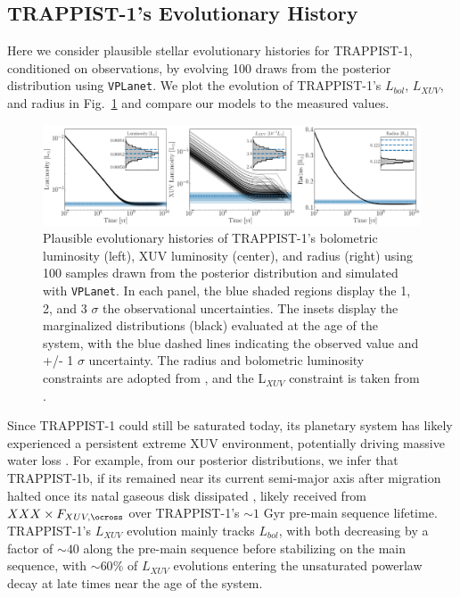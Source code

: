 \documentclass[twocolumn]{aastex62}
\newcommand{\vplanet}[0]{\texttt{VPLanet}\xspace}
\begin{document}
\subsection{TRAPPIST-1's Evolutionary History}

Here we consider plausible stellar evolutionary histories for TRAPPIST-1, conditioned on observations, by evolving 100 draws from the posterior distribution using \vplanet. We plot the evolution of TRAPPIST-1's $L_{bol}$, $L_{XUV}$, and radius in Fig.~\ref{fig:evol} and compare our models to the measured values. 

\begin{figure}[t]
	\includegraphics[width=\textwidth]{../Analysis/Evol/trappist1Evol.pdf}
   \caption{Plausible evolutionary histories of TRAPPIST-1's bolometric luminosity (left), XUV luminosity (center), and radius (right) using 100 samples drawn from the posterior distribution and simulated with \vplanet. In each panel, the blue shaded regions display the 1, 2, and 3 $\sigma$ the observational uncertainties. The insets display the marginalized distributions (black) evaluated at the age of the system, with the blue dashed lines indicating the observed value and +/- 1 $\sigma$ uncertainty. The radius and bolometric luminosity constraints are adopted from \citet{vanGrootel2018}, and the L$_{XUV}$ constraint is taken from \citet{Wheatley2017}.}%
    \label{fig:evol}%
\end{figure}

Since TRAPPIST-1 could still be saturated today, its planetary system has likely experienced a persistent extreme XUV environment, potentially driving massive water loss \citep[][;Fleming et al., in prep]{Luger2015,Bolmont2017,Bourrier2017}. For example, from our posterior distributions, we infer that TRAPPIST-1b, if its remained near its current semi-major axis after migration halted once its natal gaseous disk dissipated \citep{Luger2017}, likely received from $XXX \times F_{XUV,\ocross}$ over TRAPPIST-1's ${\sim}1$ Gyr pre-main sequence lifetime. TRAPPIST-1's $L_{XUV}$ evolution mainly tracks $L_{bol}$, with both decreasing by a factor of ${\sim}40$ along the pre-main sequence before stabilizing on the main sequence, with ${\sim}60\%$ of $L_{XUV}$ evolutions entering the unsaturated powerlaw decay at late times near the age of the system. 
\end{document}
